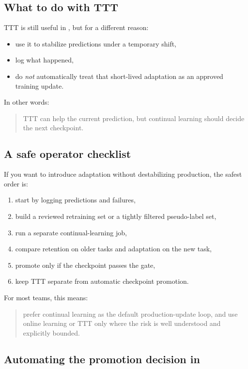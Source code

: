 \subsection{What to do with TTT}

TTT is still useful in \yolozu{}, but for a different reason:
\begin{itemize}
  \item use it to stabilize predictions under a temporary shift,
  \item log what happened,
  \item do \emph{not} automatically treat that short-lived adaptation as an approved training update.
\end{itemize}

In other words:
\begin{quote}
TTT can help the current prediction, but continual learning should decide the next checkpoint.
\end{quote}

\subsection{A safe operator checklist}

If you want to introduce adaptation without destabilizing production, the safest order is:
\begin{enumerate}
  \item start by logging predictions and failures,
  \item build a reviewed retraining set or a tightly filtered pseudo-label set,
  \item run a separate continual-learning job,
  \item compare retention on older tasks and adaptation on the new task,
  \item promote only if the checkpoint passes the gate,
  \item keep TTT separate from automatic checkpoint promotion.
\end{enumerate}

For most teams, this means:
\begin{quote}
prefer continual learning as the default production-update loop, and use online learning or TTT only where the risk is well understood and explicitly bounded.
\end{quote}

\subsection{Automating the promotion decision in \yolozu{}}

